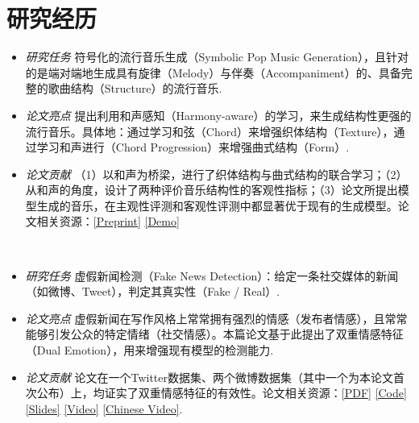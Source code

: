 \documentclass{resume}
\begin{document}
\section{研究经历}
\textbf{\large {}}
{\small {}
}
\small
\begin{itemize}
  \item \textit{研究任务} \quad 符号化的流行音乐生成（Symbolic Pop Music Generation），且针对的是端对端地生成具有旋律（Melody）与伴奏（Accompaniment）的、具备完整的歌曲结构（Structure）的流行音乐.
  \item \textit{论文亮点} \quad 提出利用和声感知（Harmony-aware）的学习，来生成结构性更强的流行音乐。具体地：通过学习和弦（Chord）来增强织体结构（Texture），通过学习和声进行（Chord Progression）来增强曲式结构（Form）.
  \item \textit{论文贡献} \quad （1）以和声为桥梁，进行了织体结构与曲式结构的联合学习；（2）从和声的角度，设计了两种评价音乐结构性的客观性指标；（3）论文所提出模型生成的音乐，在主观性评测和客观性评测中都显著优于现有的生成模型。论文相关资源：\href{https://arxiv.org/pdf/2109.06441.pdf}{[Preprint]} \href{https://drive.google.com/drive/folders/1NUJIocNp_RnOeKBj3h_G6_eZcWl8Duqn?usp=sharing}{[Demo]}
\end{itemize}

\textbf{\\ \large {}}

{\small {}
}
\small
\begin{itemize}
  \item \textit{研究任务} \quad 虚假新闻检测（Fake News Detection）：给定一条社交媒体的新闻（如微博、Tweet），判定其真实性（Fake / Real）.
  \item \textit{论文亮点} \quad 虚假新闻在写作风格上常常拥有强烈的情感（发布者情感），且常常能够引发公众的特定情绪（社交情感）。本篇论文基于此提出了双重情感特征（Dual Emotion），用来增强现有模型的检测能力.
  \item \textit{论文贡献} \quad 论文在一个Twitter数据集、两个微博数据集（其中一个为本论文首次公布）上，均证实了双重情感特征的有效性。论文相关资源：\href{https://www.zhangxueyao.com/data/www2021-dual-emotion-paper.pdf}{[PDF]} \href{https://github.com/RMSnow/WWW2021}{[Code]} \href{https://www.zhangxueyao.com/assets/www2021-dual-emotion-slides.pdf}{[Slides]} \href{https://www.zhangxueyao.com/assets/www2021-dual-emotion-video.mp4}{[Video]} \href{https://www.bilibili.com/video/BV13o4y1m7c3}{[Chinese Video]}.
\end{itemize}
\end{document}

